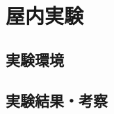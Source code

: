 \documentclass[../main]{subfiles}
\begin{document}
\graphicspath{{../figures/chap4/}}

\section{屋内実験}
\label{sec:vexp_spectral-reflectance}

\subsection{実験環境}
\label{subsec:vexp_ref_environmet}

\subsection{実験結果・考察}
\label{subsec:vexp_ref_result}
\end{document}
